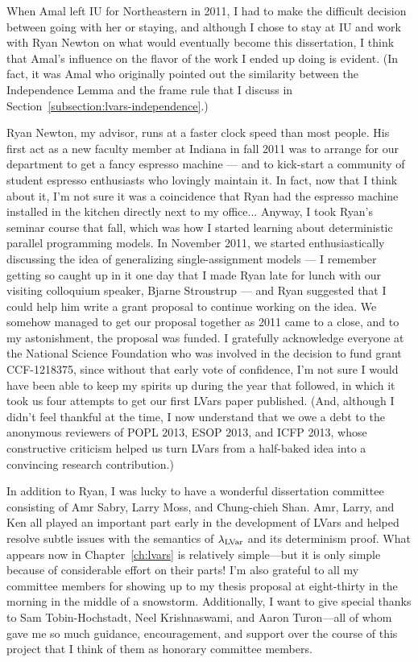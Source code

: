 When Amal left IU for Northeastern in 2011, I had to make the difficult decision between going with her or staying, and although I chose to stay at IU and work with Ryan Newton on what would eventually become this dissertation, I think that Amal's influence on the flavor of the work I ended up doing is evident.  (In fact, it was Amal who originally pointed out the similarity between the Independence Lemma and the frame rule that I discuss in Section~\ref{subsection:lvars-independence}.)

Ryan Newton, my advisor, runs at a faster clock speed than most people.  His first act as a new faculty member at Indiana in fall 2011 was to arrange for our department to get a fancy espresso machine --- and to kick-start a community of student espresso enthusiasts who lovingly maintain it.  In fact, now that I think about it, I'm not sure it was a coincidence that Ryan had the espresso machine installed in the kitchen directly next to my office...  Anyway, I took Ryan's seminar course that fall, which was how I started learning about deterministic parallel programming models.  In November 2011, we started enthusiastically discussing the idea of generalizing single-assignment models --- I remember getting so caught up in it one day that I made Ryan late for lunch with our visiting colloquium speaker, Bjarne Stroustrup --- and Ryan suggested that I could help him write a grant proposal to continue working on the idea.  We somehow managed to get our proposal together as 2011 came to a close, and to my astonishment, the proposal was funded.  I gratefully acknowledge everyone at the National Science Foundation who was involved in the decision to fund grant CCF-1218375, since without that early vote of confidence, I'm not sure I would have been able to keep my spirits up during the year that followed, in which it took us four attempts to get our first LVars paper published.  (And, although I didn't feel thankful at the time, I now understand that we owe a debt to the anonymous reviewers of POPL 2013, ESOP 2013, and ICFP 2013, whose constructive criticism helped us turn LVars from a half-baked idea into a convincing research contribution.)

In addition to Ryan, I was lucky to have a wonderful dissertation committee consisting of Amr Sabry, Larry Moss, and Chung-chieh Shan.  Amr, Larry, and Ken all played an important part early in the development of LVars and helped resolve subtle issues with the semantics of $\lambda_{\textrm{LVar}}$ and its determinism proof.  What appears now in Chapter~\ref{ch:lvars} is relatively simple---but it is only simple because of considerable effort on their parts!  I'm also grateful to all my committee members for showing up to my thesis proposal at eight-thirty in the morning in the middle of a snowstorm.  Additionally, I want to give special thanks to Sam Tobin-Hochstadt, Neel Krishnaswami, and Aaron Turon---all of whom gave me so much guidance, encouragement, and support over the course of this project that I think of them as honorary committee members.

